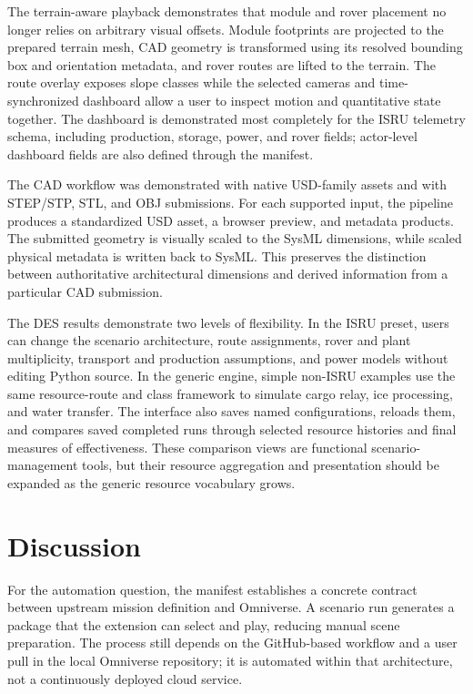 The terrain-aware playback demonstrates that module and rover placement no longer relies on arbitrary visual offsets. Module footprints are projected to the prepared terrain mesh, CAD geometry is transformed using its resolved bounding box and orientation metadata, and rover routes are lifted to the terrain. The route overlay exposes slope classes while the selected cameras and time-synchronized dashboard allow a user to inspect motion and quantitative state together. The dashboard is demonstrated most completely for the ISRU telemetry schema, including production, storage, power, and rover fields; actor-level dashboard fields are also defined through the manifest.

The CAD workflow was demonstrated with native USD-family assets and with STEP/STP, STL, and OBJ submissions. For each supported input, the pipeline produces a standardized USD asset, a browser preview, and metadata products. The submitted geometry is visually scaled to the SysML dimensions, while scaled physical metadata is written back to SysML. This preserves the distinction between authoritative architectural dimensions and derived information from a particular CAD submission.

The DES results demonstrate two levels of flexibility. In the ISRU preset, users can change the scenario architecture, route assignments, rover and plant multiplicity, transport and production assumptions, and power models without editing Python source. In the generic engine, simple non-ISRU examples use the same resource-route and class framework to simulate cargo relay, ice processing, and water transfer. The interface also saves named configurations, reloads them, and compares saved completed runs through selected resource histories and final measures of effectiveness. These comparison views are functional scenario-management tools, but their resource aggregation and presentation should be expanded as the generic resource vocabulary grows.

\section{Discussion}

For the automation question, the manifest establishes a concrete contract between upstream mission definition and Omniverse. A scenario run generates a package that the extension can select and play, reducing manual scene preparation. The process still depends on the GitHub-based workflow and a user pull in the local Omniverse repository; it is automated within that architecture, not a continuously deployed cloud service.

